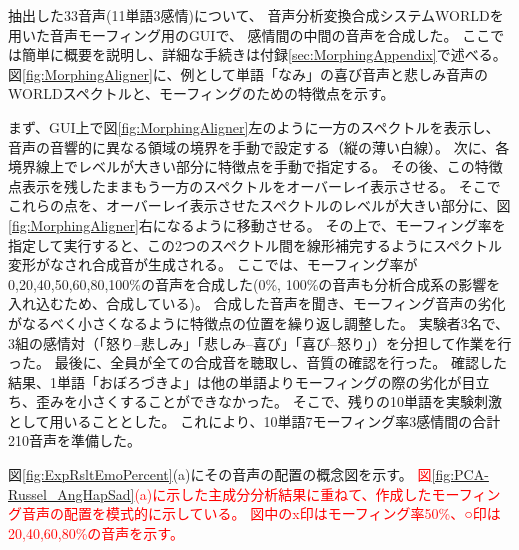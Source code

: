 抽出した33音声(11単語\time 3感情)について、
音声分析変換合成システムWORLD\cite{morise2016world}を用いた音声モーフィング用のGUI\cite{kawahara2024interactive}で、
感情間の中間の音声を合成した。
ここでは簡単に概要を説明し、詳細な手続きは付録\ref{sec:MorphingAppendix}で述べる。
図\ref{fig:MorphingAligner}に、例として単語「なみ」の喜び音声と悲しみ音声のWORLDスペクトルと、モーフィングのための特徴点を示す。

まず、GUI上で図\ref{fig:MorphingAligner}左のように一方のスペクトルを表示し、音声の音響的に異なる領域の境界を手動で設定する（縦の薄い白線）。
次に、各境界線上でレベルが大きい部分に特徴点を手動で指定する。
その後、この特徴点表示を残したままもう一方のスペクトルをオーバーレイ表示させる。
そこでこれらの点を、オーバーレイ表示させたスペクトルのレベルが大きい部分に、図\ref{fig:MorphingAligner}右になるように移動させる。
その上で、モーフィング率を指定して実行すると、この2つのスペクトル間を線形補完するようにスペクトル変形がなされ合成音が生成される。
ここでは、モーフィング率が 0,20,40,50,60,80,100\%の音声を合成した(0\%, 100\%の音声も分析合成系の影響を入れ込むため、合成している)。
合成した音声を聞き、モーフィング音声の劣化がなるべく小さくなるように特徴点の位置を繰り返し調整した。
実験者3名で、3組の感情対（「怒り--悲しみ」「悲しみ--喜び」「喜び--怒り」）を分担して作業を行った。
最後に、全員が全ての合成音を聴取し、音質の確認を行った。
確認した結果、1単語「おぼろづきよ」は他の単語よりモーフィングの際の劣化が目立ち、歪みを小さくすることができなかった。
そこで、残りの10単語を実験刺激として用いることとした。
これにより、10単語\time 7モーフィング率\time 3感情間の合計210音声を準備した。

図\ref{fig:ExpRsltEmoPercent}(a)にその音声の配置の概念図を示す。
\textcolor{red}{
  図\ref{fig:PCA-Russel_AngHapSad}(a)に示した主成分分析結果に重ねて、作成したモーフィング音声の配置を模式的に示している。
  図中のx印はモーフィング率50\%、○印は20,40,60,80\%の音声を示す。
  }






